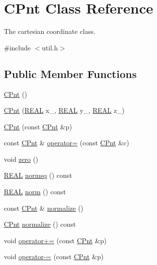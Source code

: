 \hypertarget{classCPnt}{\section{C\-Pnt Class Reference}
\label{classCPnt}
}


The cartesian coordinate class.  




{\ttfamily \#include $<$util.\-h$>$}

\subsection*{Public Member Functions}
\begin{DoxyCompactItemize}
\item 
\hyperlink{classCPnt_a6792dcfc8b95c18c03bda5a6dde7765a}{C\-Pnt} ()
\item 
\hyperlink{classCPnt_a91907d073421cdf75000d27f982f058b}{C\-Pnt} (\hyperlink{util_8h_a5821460e95a0800cf9f24c38915cbbde}{R\-E\-A\-L} x\-\_\-, \hyperlink{util_8h_a5821460e95a0800cf9f24c38915cbbde}{R\-E\-A\-L} y\-\_\-, \hyperlink{util_8h_a5821460e95a0800cf9f24c38915cbbde}{R\-E\-A\-L} z\-\_\-)
\item 
\hyperlink{classCPnt_aca4d8d7044e71700128b497cfcc4f1d8}{C\-Pnt} (const \hyperlink{classCPnt}{C\-Pnt} \&p)
\item 
const \hyperlink{classCPnt}{C\-Pnt} \& \hyperlink{classCPnt_abd18aa7c83ac70f5e73847a8cd154e9d}{operator=} (const \hyperlink{classCPnt}{C\-Pnt} \&c)
\item 
void \hyperlink{classCPnt_a619a71665a5a40fddbc8e6c6a6b450cc}{zero} ()
\item 
\hyperlink{util_8h_a5821460e95a0800cf9f24c38915cbbde}{R\-E\-A\-L} \hyperlink{classCPnt_ac4dcf209c35c4ef0c119cd59fbddd18f}{normsq} () const 
\item 
\hyperlink{util_8h_a5821460e95a0800cf9f24c38915cbbde}{R\-E\-A\-L} \hyperlink{classCPnt_ab92f2e6cc3891ff6a00eddb483b854ab}{norm} () const 
\item 
const \hyperlink{classCPnt}{C\-Pnt} \& \hyperlink{classCPnt_a79e4515e6479905942ce4b48990943f0}{normalize} ()
\item 
\hyperlink{classCPnt}{C\-Pnt} \hyperlink{classCPnt_a59899074de56c4ad55583fc58d48ea0a}{normalize} () const 
\item 
void \hyperlink{classCPnt_ab9aa57d527e60e0ba46fd44ee515ebb0}{operator+=} (const \hyperlink{classCPnt}{C\-Pnt} \&p)
\item 
void \hyperlink{classCPnt_aad46f39ec4811f1f7c39b33b0ef55f42}{operator-\/=} (const \hyperlink{classCPnt}{C\-Pnt} \&p)

\end{DoxyCompactItemize}

